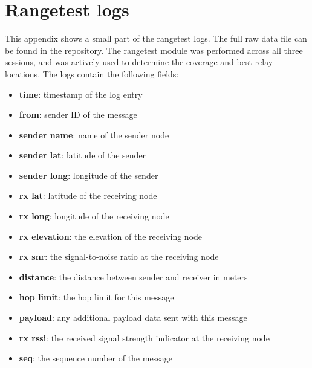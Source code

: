 \chapter{Rangetest logs}%
\label{ch:bijlage-rangetest}

This appendix shows a small part of the rangetest logs. The full raw data file can be found in the repository.
The rangetest module was performed across all three sessions, and was actively used to determine the coverage and best relay locations. The logs contain the following fields:
\begin{itemize}
    \item \textbf{time}: timestamp of the log entry
    \item \textbf{from}: sender ID of the message
    \item \textbf{sender name}: name of the sender node
    \item \textbf{sender lat}: latitude of the sender
    \item \textbf{sender long}: longitude of the sender
    \item \textbf{rx lat}: latitude of the receiving node
    \item \textbf{rx long}: longitude of the receiving node
    \item \textbf{rx elevation}: the elevation of the receiving node
    \item \textbf{rx snr}: the signal-to-noise ratio at the receiving node
    \item \textbf{distance}: the distance between sender and receiver in meters
    \item \textbf{hop limit}: the hop limit for this message
    \item \textbf{payload}: any additional payload data sent with this message
    \item \textbf{rx rssi}: the received signal strength indicator at the receiving node
    \item \textbf{seq}: the sequence number of the message
\end{itemize}

